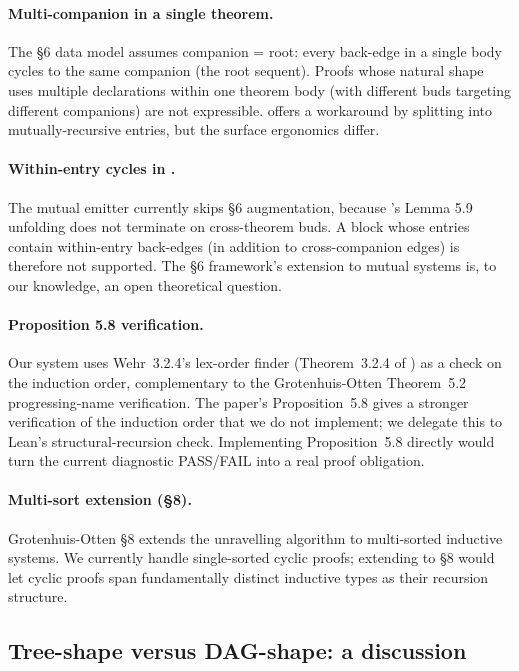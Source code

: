 \paragraph{Multi-companion in a single theorem.}
The §6 data model assumes companion = root: every back-edge in a single
 body cycles to the same companion (the root sequent).
Proofs whose natural shape uses multiple  declarations within
one theorem body (with different buds targeting different companions) are
not expressible.  offers a workaround by splitting
into mutually-recursive entries, but the surface ergonomics differ.

\paragraph{Within-entry cycles in .}
The mutual emitter currently skips §6 augmentation, because
's Lemma 5.9 unfolding does not terminate on
cross-theorem buds. A  block whose entries contain
within-entry back-edges (in addition to cross-companion edges) is therefore
not supported. The §6 framework's extension to mutual systems is, to our
knowledge, an open theoretical question.

\paragraph{Proposition 5.8 verification.}
Our system uses Wehr~3.2.4's lex-order finder (Theorem~3.2.4 of
\cite{wehr2025cyclic}) as a check on the induction order, complementary to
the Grotenhuis-Otten Theorem~5.2 progressing-name verification. The paper's
Proposition~5.8 gives a stronger verification of the induction order that
we do not implement; we delegate this to Lean's structural-recursion check.
Implementing Proposition~5.8 directly would turn the current diagnostic
PASS/FAIL into a real proof obligation.

\paragraph{Multi-sort extension (§8).}
Grotenhuis-Otten §8 extends the unravelling algorithm to multi-sorted
inductive systems. We currently handle single-sorted cyclic proofs;
extending to §8 would let cyclic proofs span fundamentally distinct
inductive types as their recursion structure.

\subsection{Tree-shape versus DAG-shape: a discussion}
\label{sec:dag-discussion}


